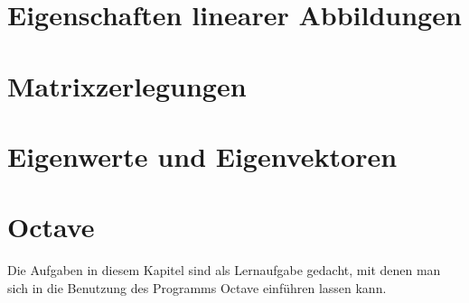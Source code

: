 \documentclass[a4paper,12pt]{book}
\begin{document}
\chapter{Eigenschaften linearer Abbildungen}

\chapter{Matrixzerlegungen}

\chapter{Eigenwerte und Eigenvektoren}
%
\chapter{Octave}
Die Aufgaben in diesem Kapitel sind als Lernaufgabe gedacht, mit denen
man sich in die Benutzung des Programms Octave einführen lassen kann.

\bigskip

\closethemaindex
\printthemata

\end{document}
